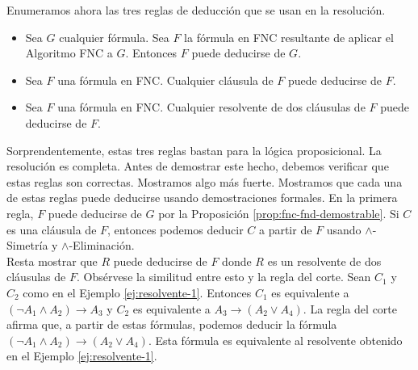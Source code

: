\documentclass[12pt,a4paper]{book}
\begin{document}
    Enumeramos ahora las tres reglas de deducción que se usan en la resolución.

    \begin{itemize}
        \item[$\bullet$] Sea $G$ cualquier fórmula. Sea $F$ la fórmula en FNC resultante de aplicar el Algoritmo FNC a $G$.
        Entonces $F$ puede deducirse de $G$.
        \item[$\bullet$] Sea $F$ una fórmula en FNC. Cualquier cláusula de $F$ puede deducirse de $F$.
        \item[$\bullet$] Sea $F$ una fórmula en FNC. Cualquier resolvente de dos cláusulas de $F$ puede deducirse de $F$.
    \end{itemize}

    Sorprendentemente, estas tres reglas bastan para la lógica proposicional. La resolución es completa. Antes de demostrar
    este hecho, debemos verificar que estas reglas son correctas. Mostramos algo más fuerte. Mostramos que cada una de estas
    reglas puede deducirse usando demostraciones formales. En la primera regla, $F$ puede deducirse de $G$ por la
    Proposición \ref{prop:fnc-fnd-demostrable}. Si $C$ es una cláusula de $F$, entonces podemos deducir $C$ a partir de $F$
    usando $\wedge$-Simetría y $\wedge$-Eliminación.\\
    Resta mostrar que $R$ puede deducirse de $F$ donde $R$ es un resolvente de dos cláusulas de $F$. Obsérvese la similitud
    entre esto y la regla del corte. Sean $C_{1}$ y $C_{2}$ como en el Ejemplo \ref{ej:resolvente-1}. Entonces $C_{1}$ es
    equivalente a $(\neg A_{1}\wedge A_{2})\rightarrow A_{3}$ y $C_{2}$ es equivalente a $A_{3}\rightarrow(A_{2}\vee A_{4})$.
    La regla del corte afirma que, a partir de estas fórmulas, podemos deducir la fórmula
    $(\neg A_{1}\wedge A_{2})\rightarrow(A_{2}\vee A_{4})$. Esta fórmula es equivalente al resolvente obtenido en el
    Ejemplo \ref{ej:resolvente-1}.
\end{document}
